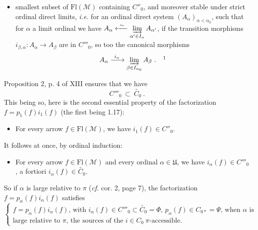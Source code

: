 \documentclass[11pt]{article}
\newcommand{\printedpage}[1]{\marginpar{\footnotesize p.~#1}}
\newcommand{\msp}[1]{\marginpar{\footnotesize [#1]}}
\newcommand{\cM}{\mathcal{M}}
\newcommand{\Fl}{\mathrm{Fl}}
\newcommand{\fU}{\mathfrak{U}}
\begin{document}
\setcounter{footnote}{1}%
\begin{itemize}[leftmargin=10em, labelwidth=9em, labelsep=1em, align=left]
\item[(1.19)\hfill $C'''_0 \ = $] smallest subset of $\Fl(\cM)$ containing $C''_0$, and moreover stable under strict ordinal direct limits, \textit{i.e.} for an ordinal direct system $(A_\alpha)_{\alpha<\alpha_0}$, such that for $\alpha$ a limit ordinal we have $A_\alpha \xleftarrow{\ \sim\ } \varinjlim\limits_{\alpha' \in I_\alpha} A_{\alpha'}$, if the transition morphisms $i_{\beta,\alpha} : A_\alpha \longrightarrow A_\beta$ are in $C'''_0$, so too the canonical morphisms
\[
A_\alpha \xrightarrow{\ i_\alpha\ } \varinjlim_{\beta \in I_{\alpha_0}} A_\beta \ . \quad \footnotemark
\]
\end{itemize}

\printedpage{8}
\msp{page 9}

Proposition 2, p. 4 of XIII ensures that we have
\[
C'''_0 \ \subset \ \widetilde{C_0} \ .
\]
This being so, here is the second essential property of the factorization $f = p_1(f)i_1(f)$ (the first being 1.17):

\begin{itemize}[leftmargin=5em, labelwidth=4em, labelsep=1em, align=left]
\item[(1.20)] \qquad\qquad For every arrow $f \in \Fl(\cM)$, we have $i_1(f) \in C''_0$.
\end{itemize}

It follows at once, by ordinal induction:

\begin{itemize}[leftmargin=5em, labelwidth=4em, labelsep=1em, align=left]
\item[(1.21)] \qquad For every arrow $f \in \Fl(\cM)$ and every ordinal $\alpha \in \fU$, we have $i_\alpha(f) \in C'''_0$, a fortiori $i_\alpha(f) \in \widetilde{C_0}$.
\end{itemize}

So if $\alpha$ is large relative to $\pi$ (\textit{cf.} cor. 2, page 7), the factorization $f = p_\alpha(f)i_\alpha(f)$ satisfies
\[
\left\{
\begin{array}{l}
f = p_\alpha(f)i_\alpha(f)\text{, with } i_\alpha(f) \in C'''_0 \subset \widetilde{C_0} = \Phi \text{, } p_\alpha(f) \in C_{0*} = \Psi \text{, when } \alpha \text{ is}\\
\text{large relative to } \pi\text{, the sources of the } i \in C_0 \ \pi\text{-accessible.}
\end{array}
\right.
\tag*{(1.22)}
\]
\end{document}
